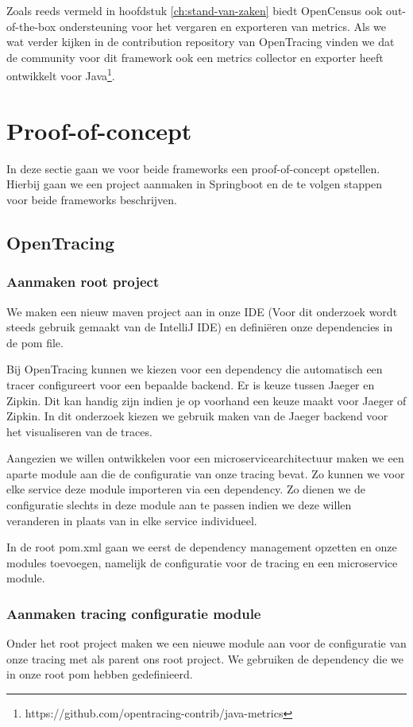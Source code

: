 Zoals reeds vermeld in hoofdstuk \ref{ch:stand-van-zaken} biedt OpenCensus ook out-of-the-box ondersteuning voor het vergaren en exporteren van metrics. Als we wat verder kijken in de contribution repository van OpenTracing vinden we dat de community voor dit framework ook een metrics collector en exporter heeft ontwikkelt voor Java\footnote{https://github.com/opentracing-contrib/java-metrics}.

\section{Proof-of-concept}
In deze sectie gaan we voor beide frameworks een proof-of-concept opstellen. Hierbij gaan we een project aanmaken in Springboot en de te volgen stappen voor beide frameworks beschrijven.

\subsection{OpenTracing}
\subsubsection{Aanmaken root project}
We maken een nieuw maven project aan in onze IDE (Voor dit onderzoek wordt steeds gebruik gemaakt van de IntelliJ IDE) en definiëren onze dependencies in de pom file.

Bij OpenTracing kunnen we kiezen voor een dependency die automatisch een tracer configureert voor een bepaalde backend. Er is keuze tussen Jaeger en Zipkin. Dit kan handig zijn indien je op voorhand een keuze maakt voor Jaeger of Zipkin. In dit onderzoek kiezen we gebruik maken van de Jaeger backend voor het visualiseren van de traces.

Aangezien we willen ontwikkelen voor een microservicearchitectuur maken we een aparte module aan die de configuratie van onze tracing bevat. Zo kunnen we voor elke service deze module importeren via een dependency. Zo dienen we de configuratie slechts in deze module aan te passen indien we deze willen veranderen in plaats van in elke service individueel.

In de root pom.xml gaan we eerst de dependency management opzetten en onze modules toevoegen, namelijk de configuratie voor de tracing en een microservice module.

\subsubsection{Aanmaken tracing configuratie module}
Onder het root project maken we een nieuwe module aan voor de configuratie van onze tracing met als parent ons root project. We gebruiken de dependency die we in onze root pom hebben gedefinieerd.

